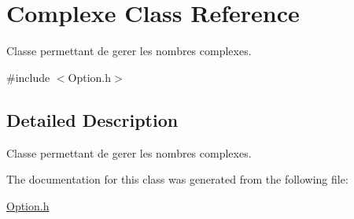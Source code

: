 \hypertarget{class_complexe}{\section{\-Complexe \-Class \-Reference}
\label{class_complexe}
}


\-Classe permettant de gerer les nombres complexes.  




{\ttfamily \#include $<$\-Option.\-h$>$}



\subsection{\-Detailed \-Description}
\-Classe permettant de gerer les nombres complexes. 

\-The documentation for this class was generated from the following file\-:\begin{DoxyCompactItemize}
\item 
\hyperlink{_option_8h}{\-Option.\-h}\end{DoxyCompactItemize}
